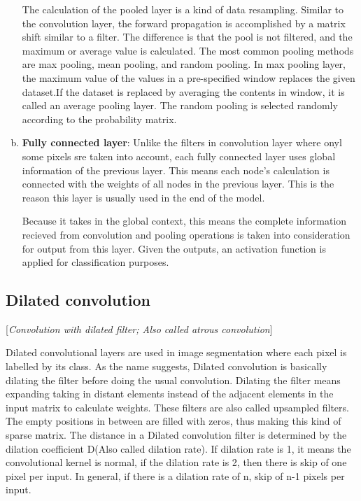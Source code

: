 \begin{enumerate}[(a)]
        The calculation of the pooled layer is a kind of data resampling. Similar to the convolution layer, the forward propagation is accomplished by a matrix shift similar to a filter. The difference is that the pool is not filtered, and the maximum or average value is calculated. The most common pooling methods are max pooling, mean pooling, and random pooling. In max pooling layer, the maximum value of the values in a pre-specified window replaces the given dataset.If the dataset is replaced by averaging the contents in window, it is called an average pooling layer. The random pooling is selected randomly according to the probability matrix.

    \item \textbf{Fully connected layer}:
        Unlike the filters in convolution layer where onyl some pixels sre taken into account, each fully connected layer uses global information of the previous layer. This means each node’s calculation is connected with the weights of all nodes in the previous layer. This is the reason this layer is usually used in the end of the model. 

        Because it takes in the global context, this means the complete information recieved from convolution and pooling operations is taken into consideration for output from this layer. Given the outputs, an activation function is applied for classification purposes.
\end{enumerate}

\subsection{Dilated convolution}
[\textit{Convolution with dilated filter; Also called atrous convolution}]

    Dilated convolutional layers are used in image segmentation where each pixel is labelled by its class. As the name suggests, Dilated convolution is basically dilating the filter before doing the usual convolution. Dilating the filter means expanding taking in distant elements instead of the adjacent elements in the input matrix to calculate weights. These filters are also called upsampled filters. The empty positions in between are filled with zeros, thus making this kind of sparse matrix. The distance in a Dilated convolution filter is determined by the dilation coefficient D(Also called dilation rate). If dilation rate is 1, it means the convolutional kernel is normal, if the dilation rate is 2, then there is skip of one pixel per input. In general, if there is a dilation rate of n, skip of n-1 pixels per input.
    
